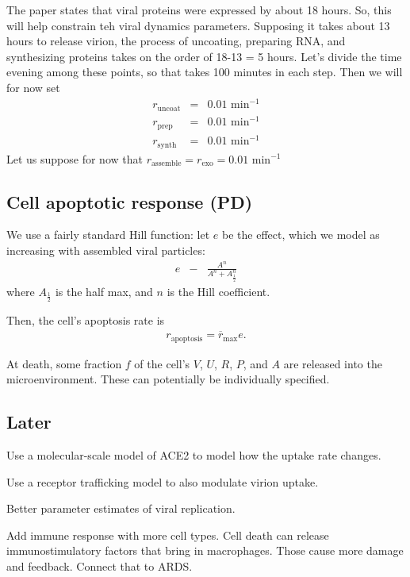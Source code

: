 \documentclass[12point]{article}
\begin{document}
The paper states that viral proteins were expressed by about 18 hours. So, this will help constrain teh viral dynamics parameters.  Supposing it takes about 13 hours to release virion, the process of uncoating, preparing RNA, and synthesizing proteins takes on the order of 18-13 = 5 hours. Let's divide the time evening among these points, so that takes 100 minutes in each step. Then we will for now set 
\begin{eqnarray}
r_\textrm{uncoat} & = & 0.01 \textrm{ min}^{-1} \\ 
r_\textrm{prep} & = & 0.01 \textrm{ min}^{-1} \\ 
r_\textrm{synth} & = & 0.01 \textrm{ min}^{-1} 
\end{eqnarray}
Let us suppose for now that $r_\textrm{assemble} = r_\textrm{exo} = 0.01 \textrm{ min}^{-1}$ 
 


\subsection{Cell apoptotic response (PD)}
We use a fairly standard Hill function: let $e$ be the effect, which we model as increasing with assembled viral particles: 
\begin{eqnarray}
e & - & \frac{ A^n  }{ A^n + A_{\frac{1}{2}}^n  }
\end{eqnarray}
where $A_{\frac{1}{2}}$ is the half max, and $n$ is the Hill coefficient. 

Then, the cell's apoptosis rate is 
\begin{eqnarray}
r_{\textrm{apoptosis}} = \overline{r}_\textrm{max} e. 
\end{eqnarray}

At death, some fraction $f$ of the cell's $V$, $U$, $R$, $P$, and $A$ are released into the microenvironment. These can potentially be individually specified. 

\subsection{Later}
Use a molecular-scale model of ACE2 to model how the uptake rate changes. 

Use a receptor trafficking model to also modulate virion uptake. 

Better parameter estimates of viral replication.

Add immune response with more cell types. Cell death can release immunostimulatory factors that bring in macrophages. Those cause more damage and feedback. Connect that to ARDS. 
\end{document}
